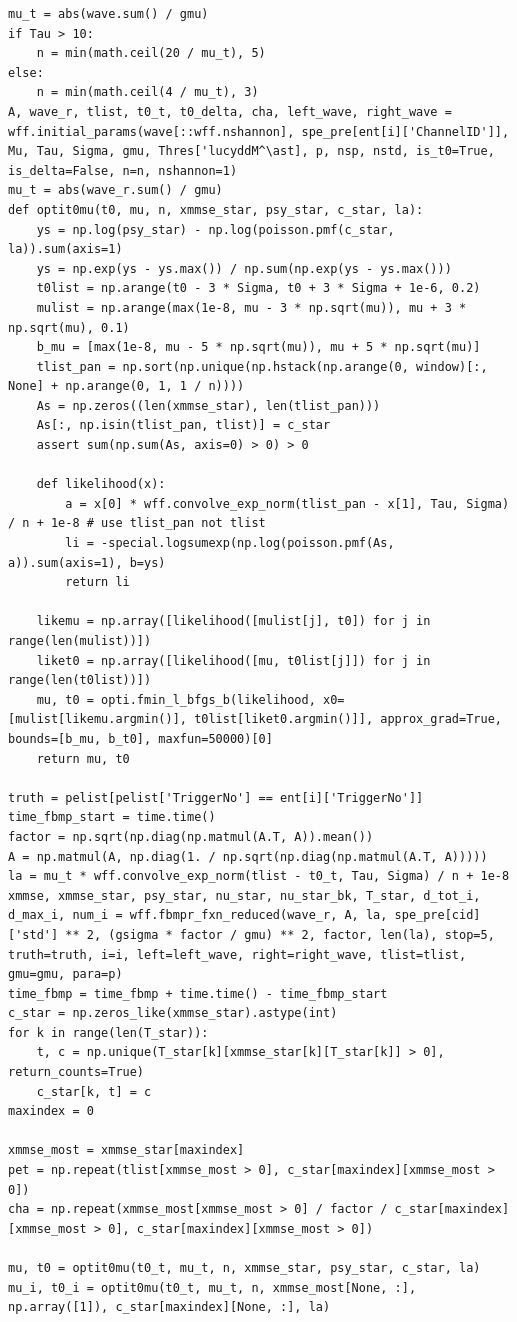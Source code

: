 \documentclass[notitlepage]{article}
\begin{document}
\begin{lstlisting}
mu_t = abs(wave.sum() / gmu)
if Tau > 10:
    n = min(math.ceil(20 / mu_t), 5)
else:
    n = min(math.ceil(4 / mu_t), 3)
A, wave_r, tlist, t0_t, t0_delta, cha, left_wave, right_wave = wff.initial_params(wave[::wff.nshannon], spe_pre[ent[i]['ChannelID']], Mu, Tau, Sigma, gmu, Thres['lucyddM^\ast], p, nsp, nstd, is_t0=True, is_delta=False, n=n, nshannon=1)
mu_t = abs(wave_r.sum() / gmu)
def optit0mu(t0, mu, n, xmmse_star, psy_star, c_star, la):
    ys = np.log(psy_star) - np.log(poisson.pmf(c_star, la)).sum(axis=1)
    ys = np.exp(ys - ys.max()) / np.sum(np.exp(ys - ys.max()))
    t0list = np.arange(t0 - 3 * Sigma, t0 + 3 * Sigma + 1e-6, 0.2)
    mulist = np.arange(max(1e-8, mu - 3 * np.sqrt(mu)), mu + 3 * np.sqrt(mu), 0.1)
    b_mu = [max(1e-8, mu - 5 * np.sqrt(mu)), mu + 5 * np.sqrt(mu)]
    tlist_pan = np.sort(np.unique(np.hstack(np.arange(0, window)[:, None] + np.arange(0, 1, 1 / n))))
    As = np.zeros((len(xmmse_star), len(tlist_pan)))
    As[:, np.isin(tlist_pan, tlist)] = c_star
    assert sum(np.sum(As, axis=0) > 0) > 0

    def likelihood(x):
        a = x[0] * wff.convolve_exp_norm(tlist_pan - x[1], Tau, Sigma) / n + 1e-8 # use tlist_pan not tlist
        li = -special.logsumexp(np.log(poisson.pmf(As, a)).sum(axis=1), b=ys)
        return li

    likemu = np.array([likelihood([mulist[j], t0]) for j in range(len(mulist))])
    liket0 = np.array([likelihood([mu, t0list[j]]) for j in range(len(t0list))])
    mu, t0 = opti.fmin_l_bfgs_b(likelihood, x0=[mulist[likemu.argmin()], t0list[liket0.argmin()]], approx_grad=True, bounds=[b_mu, b_t0], maxfun=50000)[0]
    return mu, t0

truth = pelist[pelist['TriggerNo'] == ent[i]['TriggerNo']]
time_fbmp_start = time.time()
factor = np.sqrt(np.diag(np.matmul(A.T, A)).mean())
A = np.matmul(A, np.diag(1. / np.sqrt(np.diag(np.matmul(A.T, A)))))
la = mu_t * wff.convolve_exp_norm(tlist - t0_t, Tau, Sigma) / n + 1e-8
xmmse, xmmse_star, psy_star, nu_star, nu_star_bk, T_star, d_tot_i, d_max_i, num_i = wff.fbmpr_fxn_reduced(wave_r, A, la, spe_pre[cid]['std'] ** 2, (gsigma * factor / gmu) ** 2, factor, len(la), stop=5, truth=truth, i=i, left=left_wave, right=right_wave, tlist=tlist, gmu=gmu, para=p)
time_fbmp = time_fbmp + time.time() - time_fbmp_start
c_star = np.zeros_like(xmmse_star).astype(int)
for k in range(len(T_star)):
    t, c = np.unique(T_star[k][xmmse_star[k][T_star[k]] > 0], return_counts=True)
    c_star[k, t] = c
maxindex = 0

xmmse_most = xmmse_star[maxindex]
pet = np.repeat(tlist[xmmse_most > 0], c_star[maxindex][xmmse_most > 0])
cha = np.repeat(xmmse_most[xmmse_most > 0] / factor / c_star[maxindex][xmmse_most > 0], c_star[maxindex][xmmse_most > 0])

mu, t0 = optit0mu(t0_t, mu_t, n, xmmse_star, psy_star, c_star, la)
mu_i, t0_i = optit0mu(t0_t, mu_t, n, xmmse_most[None, :], np.array([1]), c_star[maxindex][None, :], la)
\end{lstlisting}
\end{document}
